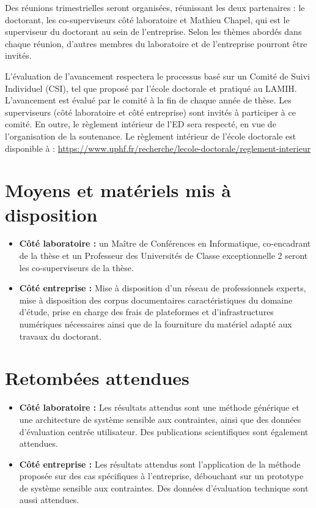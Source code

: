 \documentclass[a4paper,12pt]{article}
\begin{document}
Des réunions trimestrielles seront organisées, réunissant les deux partenaires : le doctorant, les co-superviseurs côté laboratoire et Mathieu Chapel, qui est le superviseur du doctorant au sein de l'entreprise. Selon les thèmes abordés dans chaque réunion, d'autres membres du laboratoire et de l'entreprise pourront être invités.

L'évaluation de l'avancement respectera le processus basé sur un Comité de Suivi Individuel (CSI), tel que proposé par l'école doctorale et
pratiqué au LAMIH. L'avancement est évalué par le comité à la fin de chaque année de thèse. Les superviseurs (côté laboratoire et côté entreprise) sont invités à participer à ce comité. En outre, le règlement intérieur de l'ED sera respecté, en vue de l'organisation de la soutenance. Le règlement intérieur de l'école doctorale est disponible à :
\url{https://www.uphf.fr/recherche/lecole-doctorale/reglement-interieur}
\section{Moyens et matériels mis à disposition}
\label{sec:org4d9f3a2}
\begin{itemize}
\item \textbf{Côté laboratoire :} un Maître de Conférences en Informatique, co-encadrant de la thèse et un Professeur des Universités de Classe exceptionnelle 2 seront les co-superviseurs de la thèse.
\item \textbf{Côté entreprise :} Mise à disposition d'un réseau de professionnels experts, mise à disposition des corpus documentaires caractéristiques du domaine d'étude, prise en charge des frais de plateformes et d'infrastructures numériques nécessaires ainsi que de la fourniture du matériel adapté aux travaux du doctorant.
\end{itemize}
\section{Retombées attendues}
\label{sec:org968c749}
\begin{itemize}
\item \textbf{Côté laboratoire :} Les résultats attendus sont une méthode générique et une architecture de système sensible aux contraintes, ainsi que des données d'évaluation centrée utilisateur. Des publications scientifiques sont également attendues.
\item \textbf{Côté entreprise :} Les résultats attendus sont l'application de la méthode proposée sur des cas spécifiques à l'entreprise, débouchant sur un prototype de système sensible aux contraintes. Des données d'évaluation technique sont aussi attendues.
\end{itemize}
\end{document}
